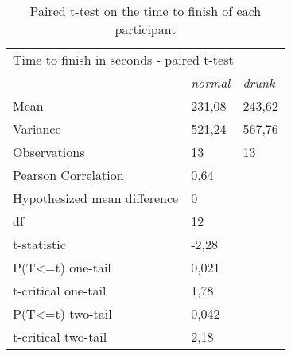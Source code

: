 \begin{table}[]
\centering
\begin{tabular}{lll}
\multicolumn{3}{l}{Time to finish in seconds - paired t-test}                                             \\
\multicolumn{1}{c|}{\textit{}}                    & \multicolumn{1}{l|}{\textit{normal}} & \textit{drunk} \\ \hline
\multicolumn{1}{l|}{Mean}                         & \multicolumn{1}{l|}{231,08}          & 243,62         \\
\multicolumn{1}{l|}{Variance}                     & \multicolumn{1}{l|}{521,24}          & 567,76         \\
\multicolumn{1}{l|}{Observations}                 & \multicolumn{1}{l|}{13}              & 13             \\
\multicolumn{1}{l|}{Pearson Correlation}          & \multicolumn{1}{l|}{0,64}            &                \\
\multicolumn{1}{l|}{Hypothesized mean difference} & \multicolumn{1}{l|}{0}               &                \\
\multicolumn{1}{l|}{df}                           & \multicolumn{1}{l|}{12}              &                \\
\multicolumn{1}{l|}{t-statistic}                  & \multicolumn{1}{l|}{-2,28}           &                \\
\multicolumn{1}{l|}{P(T\textless{}=t) one-tail}   & \multicolumn{1}{l|}{0,021}           &                \\
\multicolumn{1}{l|}{t-critical one-tail}          & \multicolumn{1}{l|}{1,78}            &                \\
\multicolumn{1}{l|}{P(T\textless{}=t) two-tail}   & \multicolumn{1}{l|}{0,042}           &                \\
\multicolumn{1}{l|}{t-critical two-tail}          & \multicolumn{1}{l|}{2,18}            &               
\end{tabular}
\caption{Paired t-test on the time to finish of each participant}
\label{table:timeToFinish t-test}
\end{table}



